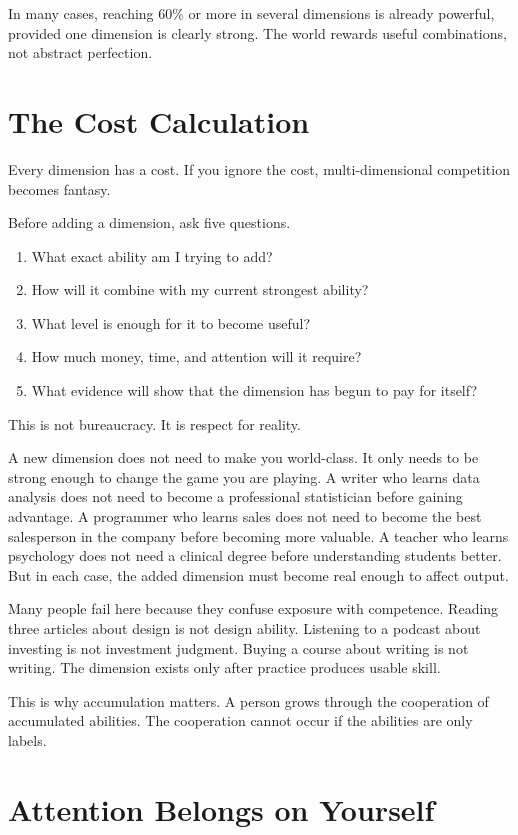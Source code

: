 In many cases, reaching 60\% or more in several dimensions is already powerful, provided one dimension is clearly strong. The world rewards useful combinations, not abstract perfection.

\section*{The Cost Calculation}

Every dimension has a cost. If you ignore the cost, multi-dimensional competition becomes fantasy.

Before adding a dimension, ask five questions.

\begin{enumerate}
\item What exact ability am I trying to add?
\item How will it combine with my current strongest ability?
\item What level is enough for it to become useful?
\item How much money, time, and attention will it require?
\item What evidence will show that the dimension has begun to pay for itself?
\end{enumerate}

This is not bureaucracy. It is respect for reality.

A new dimension does not need to make you world-class. It only needs to be strong enough to change the game you are playing. A writer who learns data analysis does not need to become a professional statistician before gaining advantage. A programmer who learns sales does not need to become the best salesperson in the company before becoming more valuable. A teacher who learns psychology does not need a clinical degree before understanding students better. But in each case, the added dimension must become real enough to affect output.

Many people fail here because they confuse exposure with competence. Reading three articles about design is not design ability. Listening to a podcast about investing is not investment judgment. Buying a course about writing is not writing. The dimension exists only after practice produces usable skill.

This is why accumulation matters. A person grows through the cooperation of accumulated abilities. The cooperation cannot occur if the abilities are only labels.

\section*{Attention Belongs on Yourself}

